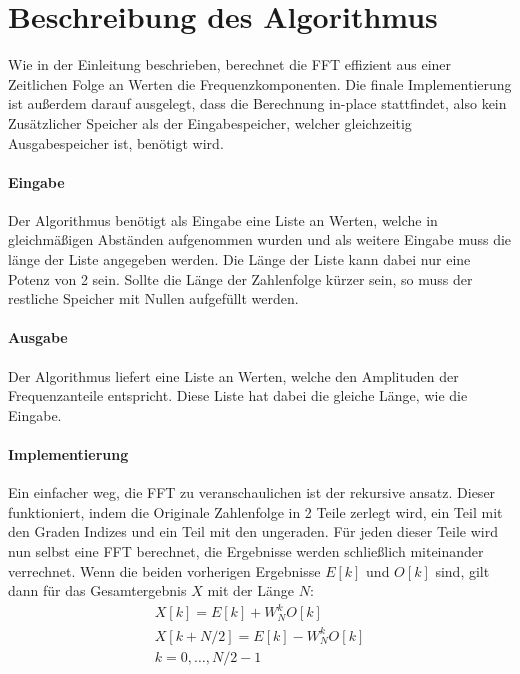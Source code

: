 \documentclass[fontsize=12pt,paper=a4,ngerman]{scrarticle}
\begin{document}
\section{Beschreibung des Algorithmus}
Wie in der Einleitung beschrieben, berechnet die FFT effizient aus einer
Zeitlichen Folge an Werten die Frequenzkomponenten. Die finale Implementierung
ist außerdem darauf ausgelegt, dass die Berechnung in-place stattfindet, also
kein Zusätzlicher Speicher als der Eingabespeicher, welcher gleichzeitig
Ausgabespeicher ist, benötigt wird.

\paragraph{Eingabe}
Der Algorithmus benötigt als Eingabe eine Liste an Werten, welche in
gleichmäßigen Abständen aufgenommen wurden und als weitere Eingabe muss die
länge der Liste angegeben werden. Die Länge der Liste kann dabei nur eine
Potenz von 2 sein. Sollte die Länge der Zahlenfolge kürzer sein, so muss der
restliche Speicher mit Nullen aufgefüllt werden.

\paragraph{Ausgabe}
Der Algorithmus liefert eine Liste an Werten, welche den Amplituden der
Frequenzanteile entspricht. Diese Liste hat dabei die gleiche Länge, wie die
Eingabe.
\paragraph{Implementierung}
Ein einfacher weg, die FFT zu veranschaulichen ist der rekursive ansatz. Dieser
funktioniert, indem die Originale Zahlenfolge in 2 Teile zerlegt wird, ein Teil
mit den Graden Indizes und ein Teil mit den ungeraden. Für jeden dieser Teile
wird nun selbst eine FFT berechnet, die Ergebnisse werden schließlich
miteinander verrechnet. Wenn die beiden vorherigen Ergebnisse $E[k]$ und $O[k]$
sind, gilt dann für das Gesamtergebnis $X$ mit der Länge $N$:
\begin{equation}
	\begin{split}
		X[k] = E[k] + W^k_N O[k]     \\
		X[k+N/2] = E[k] - W^k_N O[k] \\ k = 0, \ldots , N/2-1
	\end{split}
\end{equation}
\end{document}
